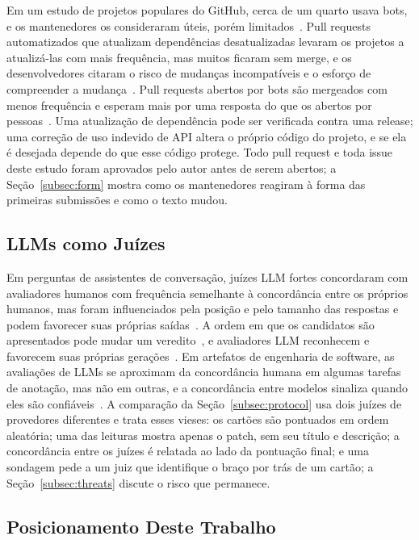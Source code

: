 \documentclass[conference]{IEEEtran}
\begin{document}
Em um estudo de projetos populares do GitHub, cerca de um quarto usava bots, e
os mantenedores os consideraram úteis, porém limitados~\cite{wessel2018bots}.
Pull requests automatizados que atualizam dependências desatualizadas levaram os
projetos a atualizá-las com mais frequência, mas muitos ficaram sem merge, e os
desenvolvedores citaram o risco de mudanças incompatíveis e o esforço de
compreender a
mudança~\cite{mirhosseini2017autopr}. Pull requests abertos por bots são
mergeados com menos frequência e esperam mais por uma resposta do que os abertos
por pessoas~\cite{wyrich2021botprs}. Uma atualização de dependência pode ser
verificada contra uma release; uma correção de uso indevido de API altera o
próprio código do projeto, e se ela é desejada depende do que esse código
protege. Todo pull request e toda issue deste estudo foram aprovados pelo autor
antes de serem abertos; a
Seção~\ref{subsec:form} mostra como os mantenedores reagiram à forma das
primeiras submissões e como o texto mudou.

\subsection{LLMs como Juízes}
\label{subsec:judges-bg}

Em perguntas de assistentes de conversação, juízes LLM fortes concordaram com
avaliadores humanos com frequência semelhante à concordância entre os próprios
humanos, mas foram influenciados pela posição e pelo tamanho das respostas e
podem favorecer suas próprias saídas~\cite{zheng2023judge}. A ordem em que os candidatos são
apresentados pode mudar um veredito~\cite{wang2024fair}, e avaliadores LLM
reconhecem e favorecem suas próprias
gerações~\cite{panickssery2024selfpref}. Em artefatos de engenharia de software,
as avaliações de LLMs se aproximam da concordância humana em algumas tarefas de
anotação, mas não em outras, e a concordância entre modelos sinaliza quando
eles são
confiáveis~\cite{ahmed2025annotation}. A comparação da
Seção~\ref{subsec:protocol} usa dois juízes de provedores diferentes e trata
esses vieses: os cartões são pontuados em ordem aleatória; uma das leituras
mostra apenas o patch, sem seu título e descrição; a concordância entre
os juízes é relatada ao lado da pontuação final; e uma sondagem pede a um juiz que
identifique o braço por trás de um cartão; a Seção~\ref{subsec:threats}
discute o risco que permanece.

\subsection{Posicionamento Deste Trabalho}
\end{document}

